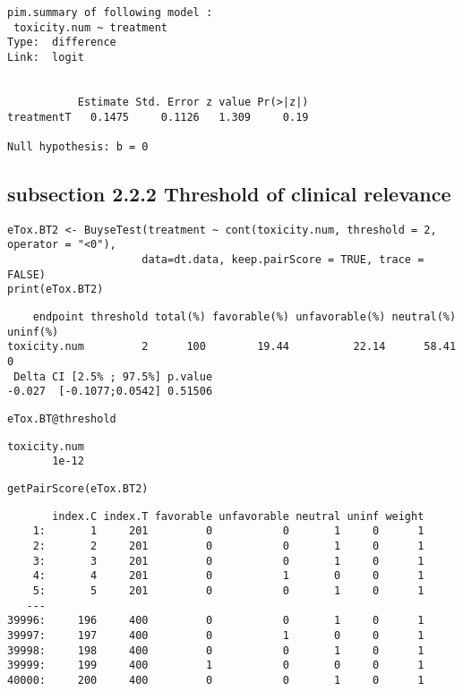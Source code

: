 \documentclass[12pt]{article}
\begin{document}
\begin{verbatim}
pim.summary of following model : 
 toxicity.num ~ treatment
Type:  difference 
Link:  logit 


           Estimate Std. Error z value Pr(>|z|)
treatmentT   0.1475     0.1126   1.309     0.19

Null hypothesis: b = 0
\end{verbatim}

\subsection{subsection 2.2.2 Threshold of clinical relevance}
\label{sec:org319d7c7}

\lstset{language=r,label= ,caption= ,captionpos=b,numbers=none}
\begin{lstlisting}
eTox.BT2 <- BuyseTest(treatment ~ cont(toxicity.num, threshold = 2, operator = "<0"),
                     data=dt.data, keep.pairScore = TRUE, trace = FALSE)
print(eTox.BT2)
\end{lstlisting}

\begin{verbatim}
    endpoint threshold total(%) favorable(%) unfavorable(%) neutral(%) uninf(%)
toxicity.num         2      100        19.44          22.14      58.41        0
 Delta CI [2.5% ; 97.5%] p.value
-0.027  [-0.1077;0.0542] 0.51506
\end{verbatim}



\lstset{language=r,label= ,caption= ,captionpos=b,numbers=none}
\begin{lstlisting}
eTox.BT@threshold
\end{lstlisting}

\begin{verbatim}
toxicity.num 
       1e-12
\end{verbatim}


\lstset{language=r,label= ,caption= ,captionpos=b,numbers=none}
\begin{lstlisting}
getPairScore(eTox.BT2)
\end{lstlisting}

\begin{verbatim}
       index.C index.T favorable unfavorable neutral uninf weight
    1:       1     201         0           0       1     0      1
    2:       2     201         0           0       1     0      1
    3:       3     201         0           0       1     0      1
    4:       4     201         0           1       0     0      1
    5:       5     201         0           0       1     0      1
   ---                                                           
39996:     196     400         0           0       1     0      1
39997:     197     400         0           1       0     0      1
39998:     198     400         0           0       1     0      1
39999:     199     400         1           0       0     0      1
40000:     200     400         0           0       1     0      1
\end{verbatim}
\end{document}
